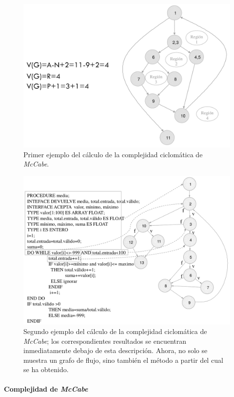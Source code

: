 \begin{figure}[H]
    \centering
    \includegraphics[width=0.9\linewidth]{Resources/Tema6/Ejemplo_McCabe.png}
    \caption{Primer ejemplo del cálculo de la complejidad ciclomática de \textit{McCabe}.}
\end{figure}

\begin{figure}[H]
    \centering
    \includegraphics[width=0.9\linewidth]{Resources/Tema6/Ejemplo_CalculoComplejidadCiclomatica.png}
    \caption{Segundo ejemplo del cálculo de la complejidad ciclomática de \textit{McCabe}; los correspondientes resultados se encuentran inmediatamente debajo de esta descripción. Ahora, no solo se muestra un grafo de flujo, sino también el método a partir del cual se ha obtenido.}
\end{figure}

\paragraph{Complejidad de \textit{McCabe}}

